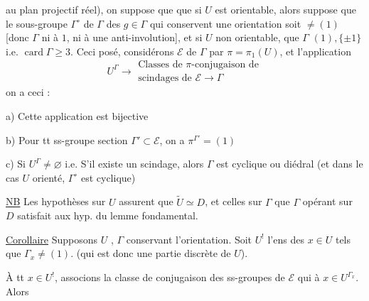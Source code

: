au plan projectif réel), on suppose que  que  si $U$ est  orientable, alors   suppose que le sous-groupe $\Gamma^\circ$ de $\Gamma$ des $g\in\Gamma$ qui conservent une orientation soit $\ne(1)$ [donc $\Gamma$  ni à $1$, ni à  une anti-involution], et si $U$ non orientable, que  $\Gamma$ \unsure{$\not\simeq$|$\ne$} $(1),\{\pm1\}$ i.e. $\operatorname{card}\Gamma\ge3$. Ceci posé,  considérons   $\mathcal E$ de $\Gamma$ par $\pi=\pi_1(U)$, et l'application
\[
U^\Gamma\longrightarrow\begin{gathered}
\text{Classes de }\pi\text{-conjugaison de}\\
\text{scindages de }\mathcal E\longrightarrow\Gamma
\end{gathered}
\]
on a ceci :

 a) Cette application est bijective

 b) Pour tt ss-groupe section $\Gamma'\subset\mathcal E$, on a $\pi^{\Gamma'}=(1)$

 c) Si $U^\Gamma\ne\varnothing$ i.e. S'il existe un scindage, alors $\Gamma$ est cyclique ou diédral (et dans le cas $U$ orienté, $\Gamma^\circ$ est cyclique)

\uline{NB} Les hypothèses sur $U$ assurent que $\widetilde U\simeq D$, et celles sur $\Gamma$ que $\Gamma$ opérant sur $D$ satisfait aux hyp. du lemme fondamental.




\uline{Corollaire} Supposons  $U$ ,  $\Gamma$ conservant l'orientation. Soit $U^!$ l'ens des $x\in U$ tels que $\Gamma_x\ne(1)$. (qui est donc une partie discrète de $U$).

À tt $x\in U^!$, associons la classe de conjugaison des ss-groupes de $\mathcal E$  qui  à  $x\in U^{\Gamma_x}$. Alors


